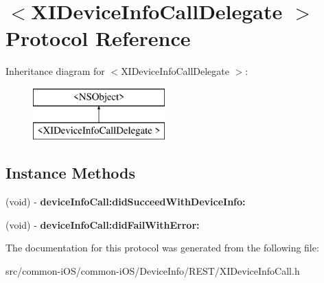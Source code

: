 \hypertarget{protocol_x_i_device_info_call_delegate_01-p}{}\section{$<$X\+I\+Device\+Info\+Call\+Delegate $>$ Protocol Reference}
\label{protocol_x_i_device_info_call_delegate_01-p}
Inheritance diagram for $<$X\+I\+Device\+Info\+Call\+Delegate $>$\+:\begin{figure}[H]
\begin{center}
\leavevmode
\includegraphics[height=2.000000cm]{protocol_x_i_device_info_call_delegate_01-p}
\end{center}
\end{figure}
\subsection*{Instance Methods}
\begin{DoxyCompactItemize}
\item 
\hypertarget{protocol_x_i_device_info_call_delegate_01-p_ab34ebd2a20de806d50afa3e11b482ff3}{}\label{protocol_x_i_device_info_call_delegate_01-p_ab34ebd2a20de806d50afa3e11b482ff3} 
(void) -\/ {\bfseries device\+Info\+Call\+:did\+Succeed\+With\+Device\+Info\+:}
\item 
\hypertarget{protocol_x_i_device_info_call_delegate_01-p_a639614e41c994eb47d355391738078ec}{}\label{protocol_x_i_device_info_call_delegate_01-p_a639614e41c994eb47d355391738078ec} 
(void) -\/ {\bfseries device\+Info\+Call\+:did\+Fail\+With\+Error\+:}
\end{DoxyCompactItemize}


The documentation for this protocol was generated from the following file\+:\begin{DoxyCompactItemize}
\item 
src/common-\/i\+O\+S/common-\/i\+O\+S/\+Device\+Info/\+R\+E\+S\+T/X\+I\+Device\+Info\+Call.\+h\end{DoxyCompactItemize}
